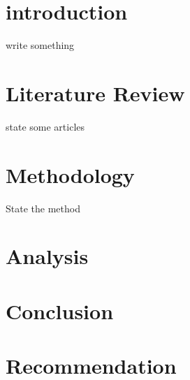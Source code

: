 \documentclass[12pt,a4paper]{article}
\begin{document}
	\chapter{introduction}
  write something
  
  \chapter{Literature Review}
  state some articles
  
  \chapter{Methodology}
  State the method
  
  \chapter{Analysis}
  
  \chapter{Conclusion}
  
  \chapter{Recommendation}
\end{document}
